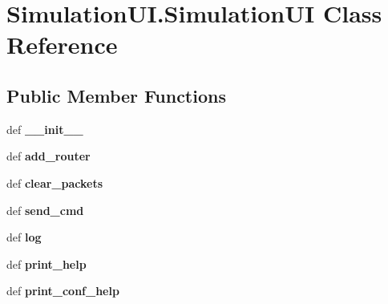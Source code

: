 \hypertarget{classSimulationUI_1_1SimulationUI}{\section{Simulation\-U\-I.\-Simulation\-U\-I Class Reference}
\label{classSimulationUI_1_1SimulationUI}
}
\subsection*{Public Member Functions}
\begin{DoxyCompactItemize}
\item 
\hypertarget{classSimulationUI_1_1SimulationUI_a7f6966f46668ae0d80410e19d1b50671}{def {\bfseries \-\_\-\-\_\-init\-\_\-\-\_\-}}\label{classSimulationUI_1_1SimulationUI_a7f6966f46668ae0d80410e19d1b50671}

\item 
\hypertarget{classSimulationUI_1_1SimulationUI_a4c431afe0340c73372b92fdb6b5e2f7f}{def {\bfseries add\-\_\-router}}\label{classSimulationUI_1_1SimulationUI_a4c431afe0340c73372b92fdb6b5e2f7f}

\item 
\hypertarget{classSimulationUI_1_1SimulationUI_ad6cfb7a6fafaf8d97c581db74797638d}{def {\bfseries clear\-\_\-packets}}\label{classSimulationUI_1_1SimulationUI_ad6cfb7a6fafaf8d97c581db74797638d}

\item 
\hypertarget{classSimulationUI_1_1SimulationUI_a9413db668bbae20bd366dfd45fb31f2d}{def {\bfseries send\-\_\-cmd}}\label{classSimulationUI_1_1SimulationUI_a9413db668bbae20bd366dfd45fb31f2d}

\item 
\hypertarget{classSimulationUI_1_1SimulationUI_acc3bcf95c305e3599a1b31a5f0069f42}{def {\bfseries log}}\label{classSimulationUI_1_1SimulationUI_acc3bcf95c305e3599a1b31a5f0069f42}

\item 
\hypertarget{classSimulationUI_1_1SimulationUI_a12e480a3e97e54b5e1dc595e2fc62348}{def {\bfseries print\-\_\-help}}\label{classSimulationUI_1_1SimulationUI_a12e480a3e97e54b5e1dc595e2fc62348}

\item 
\hypertarget{classSimulationUI_1_1SimulationUI_a59be81b3c9e11646fdc205723e18d705}{def {\bfseries print\-\_\-conf\-\_\-help}}\label{classSimulationUI_1_1SimulationUI_a59be81b3c9e11646fdc205723e18d705}


\end{DoxyCompactItemize}
